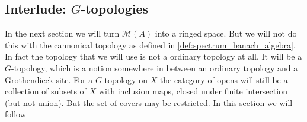 \subsection{Interlude: $G$-topologies} \label{sec:interlude_g_topologies}

In the next section we will turn $\mathcal{M} (A)$ into a ringed space. 
But we will not do this with the cannonical topology as defined in \cref{def:spectrum_banach_algebra}. 
In fact the topology that we will use is not a ordinary topology at all. 
It will be a $G$-topology, which is a notion somewhere in between an ordinary topology and a Grothendieck site. 
For a $G$ topology on $X$
the category of opens will still be a collection of subsets of $X$ with inclusion maps, closed under finite intersection (but not union). But the set of covers may be restricted. 
In this section we will follow \cite[][sec. 9.1.]{siegfriedboschNonArchimedeanAnalysisSystematic1984}

